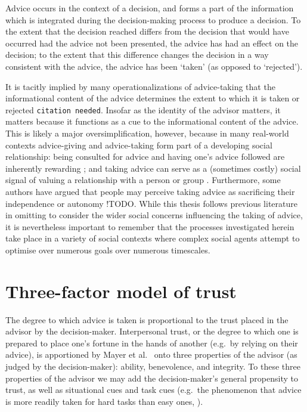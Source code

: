 \documentclass[a4paper, nobind]{templates/ociamthesis}
\begin{document}
Advice occurs in the context of a decision, and forms a part of the information which is integrated during the decision-making process to produce a decision. To the extent that the decision reached differs from the decision that would have occurred had the advice not been presented, the advice has had an effect on the decision; to the extent that this difference changes the decision in a way consistent with the advice, the advice has been `taken' (as opposed to `rejected').

It is tacitly implied by many operationalizations of advice-taking that the informational content of the advice determines the extent to which it is taken or rejected \texttt{citation\ needed}. Insofar as the identity of the advisor matters, it matters because it functions as a cue to the informational content of the advice. This is likely a major oversimplification, however, because in many real-world contexts advice-giving and advice-taking form part of a developing social relationship: being consulted for advice and having one's advice followed are inherently rewarding \autocite{hertzIntrinsicValueSocial2018,hertzNeuralComputationsUnderpinning2017}; and taking advice can serve as a (sometimes costly) social signal of valuing a relationship with a person or group \autocite{byrneOstracismReducesReliance2016}. Furthermore, some authors have argued that people may perceive taking advice as sacrificing their independence or autonomy \autocite{CITATIONNEEDED}!TODO. While this thesis follows previous literature in omitting to consider the wider social concerns influencing the taking of advice, it is nevertheless important to remember that the processes investigated herein take place in a variety of social contexts where complex social agents attempt to optimise over numerous goals over numerous timescales.

\hypertarget{three-factor-model-of-trust}{%
\section*{Three-factor model of trust}\label{three-factor-model-of-trust}}

The degree to which advice is taken is proportional to the trust placed in the advisor by the decision-maker. Interpersonal trust, or the degree to which one is prepared to place one's fortune in the hands of another (e.g.~by relying on their advice), is apportioned by Mayer et al.~\autocite*{mayerIntegrativeModelOrganizational1995} onto three properties of the advisor (as judged by the decision-maker): ability, benevolence, and integrity. To these three properties of the advisor we may add the decision-maker's general propensity to trust, as well as situational cues and task cues (e.g.~the phenomenon that advice is more readily taken for hard tasks than easy ones, \autocite{ginoEffectsTaskDifficulty2007}).
\end{document}
